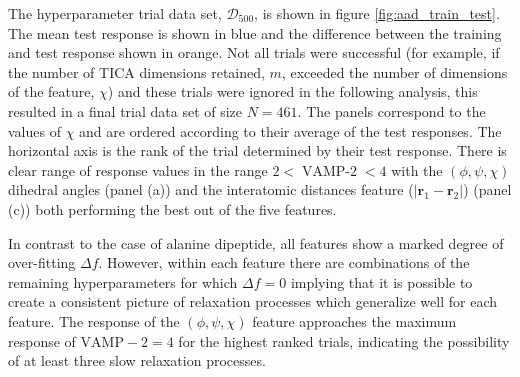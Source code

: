 The hyperparameter trial data set, $\mathcal{D}_{500}$, is shown in figure \ref{fig:aad_train_test}. The mean test response is shown in blue and the difference between the training and test response shown in orange. Not all trials were successful (for example, if the number of TICA dimensions retained, $m$, exceeded the number of dimensions of the feature, $\chi$) and these trials were ignored in the following analysis, this resulted in a final trial data set of size $N=461$. The panels correspond to the values of $\chi$ and are ordered according to their average of the test responses. The horizontal axis is the rank of the trial determined by their test response. There is clear range of response values in the range $2 < \operatorname{VAMP-2} < 4$ with the $(\phi, \psi, \chi)$ dihedral angles  (panel (a)) and the interatomic distances feature ($\left|\mathbf{r}_{1}-\mathbf{r}_{2}\right|$) (panel (c)) both performing the best out of the five features. 

In contrast to the case of alanine dipeptide, all features show a marked degree of over-fitting $\Delta f$. However, within each feature there are combinations of the remaining hyperparameters for which $\Delta f=0$ implying that it is possible to create a consistent picture of relaxation processes which generalize well for each feature. The response of the $(\phi, \psi, \chi)$ feature  approaches the maximum response of $\mathrm{VAMP-2} = 4$ for the highest ranked trials, indicating the possibility of at least three slow relaxation processes. 

